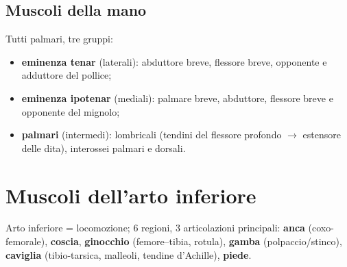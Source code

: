 \subsection{Muscoli della mano}
Tutti palmari, tre gruppi:
\begin{itemize}
  \item \textbf{eminenza tenar} (laterali): abduttore breve, flessore breve, opponente e adduttore
    del pollice;
  \item \textbf{eminenza ipotenar} (mediali): palmare breve, abduttore, flessore breve e opponente
    del mignolo;
  \item \textbf{palmari} (intermedi): lombricali (tendini del flessore profondo $\rightarrow$
    estensore delle dita), interossei palmari e dorsali.
\end{itemize}

\section{Muscoli dell'arto inferiore}

Arto inferiore = locomozione; 6 regioni, 3 articolazioni principali: \textbf{anca} (coxo-femorale),
\textbf{coscia}, \textbf{ginocchio} (femore--tibia, rotula), \textbf{gamba} (polpaccio/stinco),
\textbf{caviglia} (tibio-tarsica, malleoli, tendine d'Achille), \textbf{piede}.

